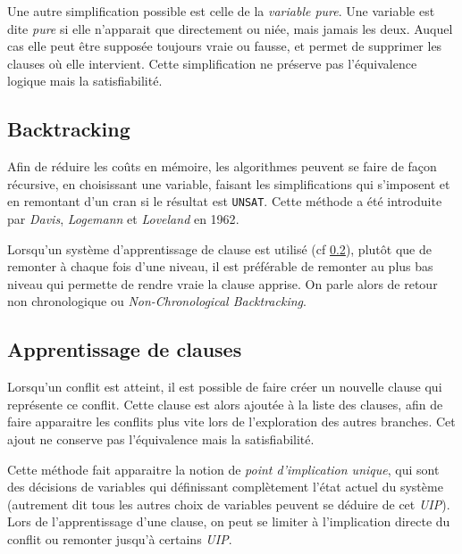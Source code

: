 Une autre simplification possible est celle de la \emph{variable pure}. Une
variable est dite \emph{pure} si elle n'apparait que directement ou niée, mais
jamais les deux. Auquel cas elle peut être supposée toujours vraie ou fausse,
et permet de supprimer les clauses où elle intervient. Cette simplification
ne préserve pas l'équivalence logique mais la satisfiabilité.

\subsection{Backtracking}\label{back}
Afin de réduire les coûts en mémoire, les algorithmes peuvent se faire de
façon récursive, en choisissant une variable, faisant les simplifications qui
s'imposent et en remontant d'un cran si le résultat est \texttt{UNSAT}. Cette
méthode a été introduite par \emph{Davis}, \emph{Logemann} et \emph{Loveland}
en 1962\cite{dll62}.

Lorsqu'un système d'apprentissage de clause est utilisé (cf \ref{cdcl}), plutôt
que de remonter à chaque fois d'une niveau, il est préférable de remonter au
plus bas niveau qui permette de rendre vraie la clause apprise. On parle alors
de retour non chronologique ou \emph{Non-Chronological Backtracking}.

\subsection{Apprentissage de clauses}\label{cdcl}
Lorsqu'un conflit est atteint, il est possible de faire créer un nouvelle
clause qui représente ce conflit. Cette clause est alors ajoutée à la liste
des clauses, afin de faire apparaitre les conflits plus vite lors de
l'exploration des autres branches. Cet ajout ne conserve pas l'équivalence
mais la satisfiabilité.

Cette méthode fait apparaitre la notion de \emph{point d'implication unique},
qui sont des décisions de variables qui définissant complètement l'état actuel
du système (autrement dit tous les autres choix de variables peuvent se déduire
de cet \emph{UIP}). Lors de l'apprentissage d'une clause, on peut se limiter
à l'implication directe du conflit ou remonter jusqu'à certains \emph{UIP}.

